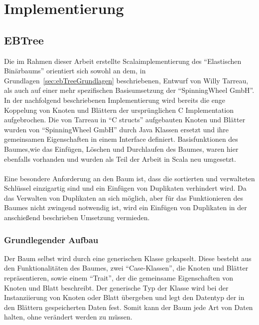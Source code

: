 \documentclass[a4paper,11pt,oneside,%
headsepline,												%
footsepline,												%
bibtotocnumbered									%
]{scrreprt}
\begin{document}
\chapter{Implementierung}

\section{EBTree} %
\label{sec:EbTreeImpl}
Die im Rahmen dieser Arbeit erstellte Scalaimplementierung des \enquote{Elastischen Binärbaums} orientiert sich sowohl an dem, in Grundlagen~\ref{sec:ebTreeGrundlagen} beschriebenen, Entwurf von Willy Tarreau\autocite{Tarreau}, als auch auf einer mehr spezifischen Basisumsetzung der \enquote{SpinningWheel GmbH}.\\
In der nachfolgend beschriebenen Implementierung  wird bereits die enge Koppelung von Knoten und Blättern der ursprünglichen C Implementation aufgebrochen. Die von Tarreau in \enquote{C structs} aufgebauten Knoten und Blätter wurden von \enquote{SpinningWheel GmbH} durch Java Klassen ersetzt und ihre gemeinsamen Eigenschaften in einem Interface definiert. Basisfunktionen des Baumes,wie das Einfügen, Löschen und Durchlaufen des Baumes, waren hier ebenfalls vorhanden und wurden als Teil der Arbeit in Scala neu umgesetzt.\\\\
Eine besondere Anforderung an den Baum ist, dass die sortierten und verwalteten Schlüssel einzigartig sind und ein Einfügen von Duplikaten verhindert wird. Da das Verwalten von Duplikaten an sich möglich, aber für das Funktionieren des Baumes nicht zwingend notwendig ist, wird ein Einfügen von Duplikaten in der anschießend beschrieben Umsetzung vermieden. \\
\subsection{Grundlegender Aufbau}
Der Baum selbst wird durch eine generischen Klasse gekapselt. Diese besteht aus den Funktionalitäten des Baumes, zwei \enquote{Case-Klassen}, die Knoten und Blätter repräsentieren, sowie einem \enquote{Trait}, der die gemeinsame Eigenschaften von Knoten und Blatt beschreibt. Der generische Typ der Klasse wird bei der Instanziierung von Knoten oder Blatt übergeben und legt den Datentyp der in den Blättern gespeicherten Daten fest. Somit kann der Baum jede Art von Daten halten, ohne verändert werden zu müssen.\\
\end{document}
